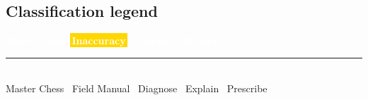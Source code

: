 \documentclass[11pt]{article}
\newcommand{\chip}[2]{\,\colorbox{#1}{\textcolor{white}{\sffamily\bfseries\footnotesize\,#2\,}}\,}
\newcommand{\best}{\chip{forestlt}{Best}}
\newcommand{\good}{\chip{forest}{Good}}
\newcommand{\inacc}{\chip{gold}{Inaccuracy}}
\newcommand{\mistake}{\chip{walnutmid}{Mistake}}
\newcommand{\blun}{\chip{blunder}{Blunder}}
\begin{document}
\subsection{Classification legend}

\begin{center}
\best\quad\good\quad\inacc\quad\mistake\quad\blun
\end{center}

\vfill
\begin{center}
{\color{rulehair}\rule{0.5\linewidth}{0.6pt}}\\[4pt]
{\sffamily\footnotesize\color{slate}
Master Chess \textbullet\ Field Manual \textbullet\ Diagnose \textbullet\ Explain
\textbullet\ Prescribe}
\end{center}
\end{document}

